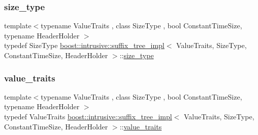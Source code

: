 \mbox{\label{classboost_1_1intrusive_1_1suffix__tree__impl_ad98ea23cb22b9adc18366b5d8ab56d9b}} 
\subsubsection{\texorpdfstring{size\+\_\+type}{size\_type}}
{\footnotesize\ttfamily template$<$typename Value\+Traits , class Size\+Type , bool Constant\+Time\+Size, typename Header\+Holder $>$ \\
typedef Size\+Type \hyperlink{classboost_1_1intrusive_1_1suffix__tree__impl}{boost\+::intrusive\+::suffix\+\_\+tree\+\_\+impl}$<$ Value\+Traits, Size\+Type, Constant\+Time\+Size, Header\+Holder $>$\+::\hyperlink{classboost_1_1intrusive_1_1suffix__tree__impl_ad98ea23cb22b9adc18366b5d8ab56d9b}{size\+\_\+type}}

\mbox{\label{classboost_1_1intrusive_1_1suffix__tree__impl_a30d9e164c38c11cd38917ad14e9f3e88}} 
\subsubsection{\texorpdfstring{value\+\_\+traits}{value\_traits}}
{\footnotesize\ttfamily template$<$typename Value\+Traits , class Size\+Type , bool Constant\+Time\+Size, typename Header\+Holder $>$ \\
typedef Value\+Traits \hyperlink{classboost_1_1intrusive_1_1suffix__tree__impl}{boost\+::intrusive\+::suffix\+\_\+tree\+\_\+impl}$<$ Value\+Traits, Size\+Type, Constant\+Time\+Size, Header\+Holder $>$\+::\hyperlink{classboost_1_1intrusive_1_1suffix__tree__impl_a30d9e164c38c11cd38917ad14e9f3e88}{value\+\_\+traits}}

\mbox{\label{classboost_1_1intrusive_1_1suffix__tree__impl_a592893260249dc653dfe9f36ea5d14b6}} 
